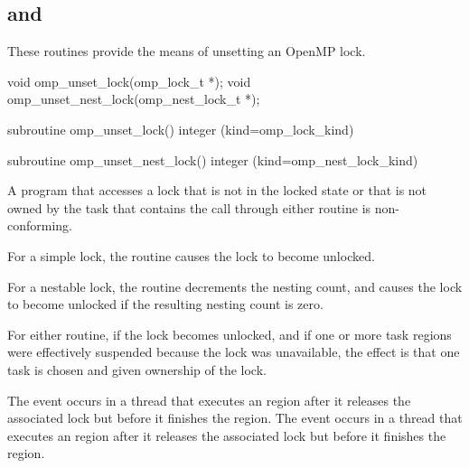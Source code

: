 \subsection{ and }
\label{subsec:omp_unset_lock and omp_unset_nest_lock}
\summary
These routines provide the means of unsetting an OpenMP lock.

\format
\begin{ccppspecific}
\begin{ompcFunction}
void omp_unset_lock(omp_lock_t *);
void omp_unset_nest_lock(omp_nest_lock_t *);
\end{ompcFunction}
\end{ccppspecific}

\begin{fortranspecific}
\begin{ompfSubroutine}
subroutine omp_unset_lock()
integer (kind=omp_lock_kind) 

subroutine omp_unset_nest_lock()
integer (kind=omp_nest_lock_kind) 
\end{ompfSubroutine}
\end{fortranspecific}

\constraints
A program that accesses a lock that is not in the locked state or that is
not owned by the task that contains the call through either routine is
non-conforming.

\effect
For a simple lock, the  routine causes the lock to 
become unlocked.

For a nestable lock, the  routine decrements 
the nesting count, and causes the lock to become unlocked if the resulting 
nesting count is zero.

For either routine, if the lock becomes unlocked, and if one or more task
regions were effectively suspended because the lock was unavailable, the
effect is that one task is chosen and given ownership of the lock.

\events
The  event occurs in a thread that executes an 
 region after it releases the associated lock but 
before it finishes the region. The  event occurs 
in a thread that executes an  region after it 
releases the associated lock but before it finishes the region.

